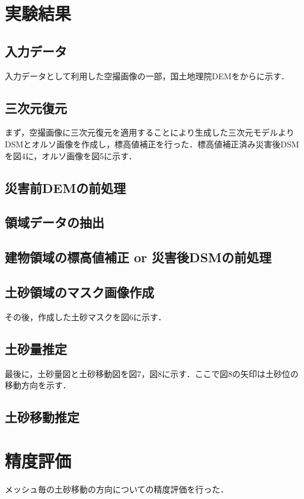   \section{実験結果}
    \subsection{入力データ}
    入力データとして利用した空撮画像の一部，国土地理院DEMを\fref{}から\fref{}に示す．
  
    \subsection{三次元復元}
      まず，空撮画像に三次元復元を適用することにより生成した三次元モデルよりDSMとオルソ画像を作成し，標高値補正を行った．標高値補正済み災害後DSMを図4に，オルソ画像を図5に示す．

    \subsection{災害前DEMの前処理}


    \subsection{領域データの抽出}
    
    
    \subsection{建物領域の標高値補正 or 災害後DSMの前処理}
    
    
    \subsection{土砂領域のマスク画像作成}
      その後，作成した土砂マスクを図6に示す．

    \subsection{土砂量推定}
      最後に，土砂量図と土砂移動図を図7，図8に示す．ここで図8の矢印は土砂位の移動方向を示す．

    \subsection{土砂移動推定}


  \section{精度評価}
    メッシュ毎の土砂移動の方向についての精度評価を行った．

